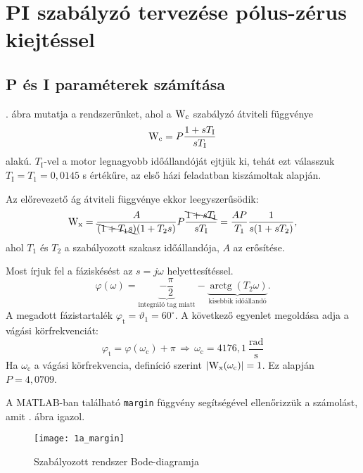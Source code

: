 \section{PI szabályzó tervezése pólus-zérus kiejtéssel}

\subsection{P és I paraméterek számítása}

. ábra mutatja a rendszerünket, ahol a $ \mathrm{W}_\text{c} $ szabályzó átviteli függvénye
\begin{equation}
	\mathrm{W}_\text{c} = P\frac{1+sT_\text{I}}{sT_\text{I}}
\end{equation}
alakú.
$T_\text{I}$-vel a motor legnagyobb időállandóját ejtjük ki, tehát ezt válasszuk $T_\text{I}=T_1=0,0145$ s értékűre,
az első házi feladatban kiszámoltak alapján.

Az előrevezető ág átviteli függvénye ekkor leegyszerűsödik:
\begin{equation}
	\mathrm{W}_\text{x} = \frac{A}{\bcancel{(1+T_1s)}(1+T_2s)}P\frac{\bcancel{1+sT_\text{I} }}{sT_\text{I}}
	= \frac{AP}{T_\text{1}}\frac{1}{s(1+sT_2)},
\end{equation}
ahol $T_1$ és $T_2$ a szabályozott szakasz időállandója, $A$ az erősítése.

Most írjuk fel a fáziskésést az $s=j\omega$ helyettesítéssel.
\begin{equation}
	\varphi(\omega) = \underbrace{-\frac{\pi}{2}}_\text{integráló tag miatt} - \underbrace{\operatorname{arctg}(T_2\omega)}_\text{kisebbik időállandó}.
\end{equation}
A megadott fázistartalék $\varphi_\text{t} = \vartheta_1=60^\circ$. A következő egyenlet megoldása adja a vágási
körfrekvenciát:
\begin{equation}
	\varphi_\text{t} = \varphi(\omega_\text{c}) +\pi \,\Rightarrow\, \omega_\text{c} = 4176,1~\frac{\text{rad}}{\text{s}}
\end{equation}
Ha $\omega_\text{c}$ a vágási körfrekvencia, definíció szerint $\left\lvert \mathrm{W}_\text{x}(\omega_\text{c}) \right\rvert = 1$.
Ez alapján $ P = 4,0709$.

A MATLAB-ban található \verb|margin| függvény segítségével ellenőrizzük a számolást, amit . ábra igazol.
\begin{figure}[H]
	\centering
	\texttt{[image: 1a\_margin]}
	\caption{Szabályozott rendszer Bode-diagramja}
	\label{fig:1a_margin}
\end{figure}

